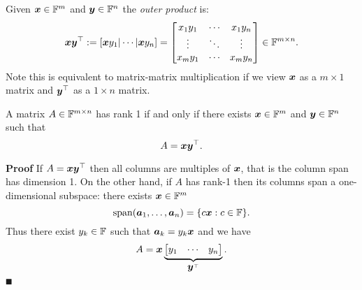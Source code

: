 \begin{definition} Given $\bm{{\mbox{\boldmath$x$\unboldmath}}} \in {\mathbb F}^m$ and $\bm{{\mbox{\boldmath$y$\unboldmath}}} \in {\mathbb F}^n$ the \emph{outer product} is:
\[
\ensuremath{\bm{\x}} \ensuremath{\bm{\y}}^\ensuremath{\top} := [\ensuremath{\bm{\x}} y_1 | \ensuremath{\cdots} | \ensuremath{\bm{\x}} y_n] = \begin{bmatrix} x_1 y_1 & \ensuremath{\cdots} & x_1 y_n \\
                        \ensuremath{\vdots} & \ensuremath{\ddots} & \ensuremath{\vdots} \\
                        x_m y_1 & \ensuremath{\cdots} & x_m y_n \end{bmatrix} \ensuremath{\in} \ensuremath{\bbF}^{m \ensuremath{\times} n}.
\]
Note this is equivalent to matrix-matrix multiplication if we view $\bm{{\mbox{\boldmath$x$\unboldmath}}}$ as a $m \ensuremath{\times} 1$ matrix and $\bm{{\mbox{\boldmath$y$\unboldmath}}}^\top$ as a $1 \ensuremath{\times} n$ matrix. \end{definition}

\begin{proposition}[rank-1] A matrix $A \in {\mathbb F}^{m\times n}$ has rank 1 if and only if there exists $\bm{{\mbox{\boldmath$x$\unboldmath}}} \in {\mathbb F}^m$ and $\bm{{\mbox{\boldmath$y$\unboldmath}}} \in {\mathbb F}^n$ such that
\[
A = \bm{{\mbox{\boldmath$x$\unboldmath}}} \bm{{\mbox{\boldmath$y$\unboldmath}}}^\top.
\]
\end{proposition}
\textbf{Proof} If $A = \bm{{\mbox{\boldmath$x$\unboldmath}}} \bm{{\mbox{\boldmath$y$\unboldmath}}}^\top$ then all columns are multiples of $\bm{{\mbox{\boldmath$x$\unboldmath}}}$, that is the column span has dimension 1.  On the other hand, if $A$ has rank-1 then its columns span a one-dimensional subspace: there exists $\bm{{\mbox{\boldmath$x$\unboldmath}}} \in {\mathbb F}^m$
\[
{\rm span}(\bm{{\mbox{\boldmath$a$\unboldmath}}}_1, \ldots, \bm{{\mbox{\boldmath$a$\unboldmath}}}_n) = \{ c \bm{{\mbox{\boldmath$x$\unboldmath}}} : c \in {\mathbb F} \}.
\]
Thus there exist $y_k \in {\mathbb F}$ such that $\bm{{\mbox{\boldmath$a$\unboldmath}}}_k = y_k \bm{{\mbox{\boldmath$x$\unboldmath}}}$ and we have
\[
A = \ensuremath{\bm{\x}} \underbrace{\begin{bmatrix} y_1 & \ensuremath{\cdots} & y_n \end{bmatrix}}_{\ensuremath{\bm{\y}}^\ensuremath{\top}}.
\]
\ensuremath{\QED}


